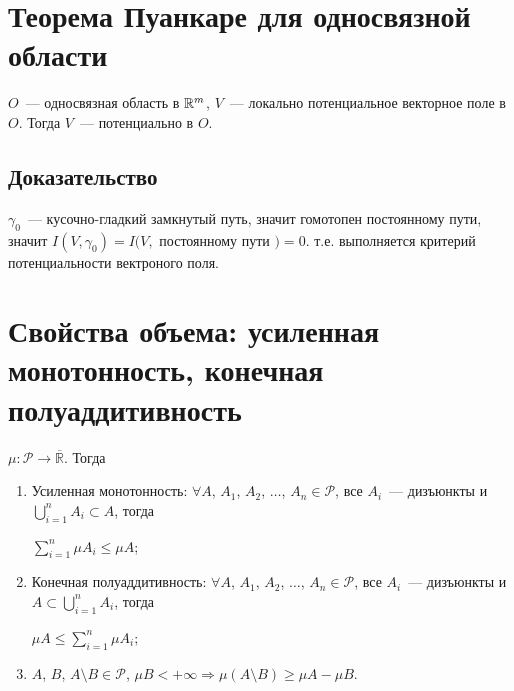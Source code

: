 \documentclass{article}
\begin{document}
    \newpage
    
    \section{Теорема Пуанкаре для односвязной области}
    
        $O$~--- односвязная область в $\mathbb{R}^m$, $V$~--- локально потенциальное векторное поле в $O$. Тогда $V$~--- потенциально в $O$.
        
        \subsection{Доказательство}
        
            $\gamma_0$~--- кусочно-гладкий замкнутый путь, значит гомотопен постоянному пути, значит $I(V, \gamma_0) = I(V,$ постоянному пути $) = 0$. т.е. выполняется критерий потенциальности вектроного поля.
            
    \newpage
    
    \section{Свойства объема: усиленная монотонность, конечная полуаддитивность}
    
        $\mu : \mathcal{P} \rightarrow \overline{\mathbb{R}}$. Тогда
        
        \begin{enumerate}
        
            \item Усиленная монотонность: $\forall A$, $A_1$, $A_2$, $\ldots$, $A_n \in \mathcal{P}$, все $A_i$~--- дизъюнкты и $\bigcup\limits^n_{i = 1}A_i \subset A$, тогда
            
                $\sum\limits^n_{i = 1} \mu A_i \leq \mu A$;
                
            \item Конечная полуаддитивность: $\forall A$, $A_1$, $A_2$, $\ldots$, $A_n \in \mathcal{P}$, все $A_i$~--- дизъюнкты и $A \subset \bigcup\limits^n_{i = 1} A_i$, тогда
            
                $\mu A \leq \sum\limits^n_{i = 1} \mu A_i$;
                
            \item $A$, $B$, $A \setminus B \in \mathcal{P}$, $\mu B < +\infty \Rightarrow \mu \left( A \setminus B \right) \geq \mu A - \mu B$.
            
        \end{enumerate}
        
\end{document}
